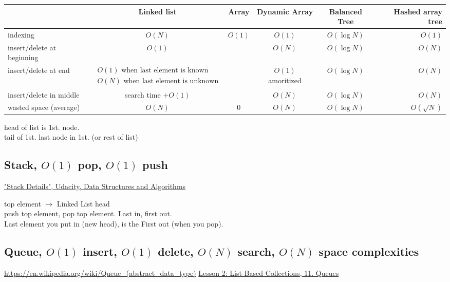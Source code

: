 \documentclass[10pt]{amsart}
\begin{document}
\begin{multicols*}{2}
\begin{center}
	\begin{tabular}{ l | c | c | c | c | r }
		\hline
		& Linked list & Array & Dynamic Array & Balanced Tree & Hashed array tree \\ \hline 
		indexing & $O(N)$ & $O(1)$ & $O(1)$ & $O(\log{N})$ & $O(1)$ \\ \hline 
		insert/delete at beginning & $O(1)$ &  & $O(N)$ & $O(\log{N})$ & $O(N)$ \\ \hline 
		insert/delete at end & $\begin{gathered} O(1) \text{ when last element is known } \\ O(N) \text{ when last element is unknown }\end{gathered}$ &  & $O(1)$ amoritized  & $O(\log{N})$  & $O(N)$ \\ \hline 
		insert/delete in middle & search time $+ O(1)$ &  & $O(N)$ & $O(\log{N})$ & $O(N)$ \\ \hline 
		wasted space (average) & $O(N)$ & 0  & $O(N)$ & $O(\log{N})$ & $O(\sqrt{N})$ \\ \hline 
		\hline
	\end{tabular}
\end{center}

head of list is 1st. node. \\
tail of 1st. last node in 1st. (or rest of list)

\subsection{Stack, $O(1)$ pop, $O(1)$ push}

\href{https://classroom.udacity.com/courses/ud513/lessons/7117335401/concepts/71225347790923}{"Stack Details", Udacity, Data Structures and Algorithms}

top element $\mapsto $ Linked List head \\
push top element, pop top element.
Last in, first out. \\
Last element you put in (new head), is the First out (when you pop).

\subsection{Queue, $O(1)$ insert, $O(1)$ delete, $O(N)$ search, $O(N)$ space complexities}

\url{https://en.wikipedia.org/wiki/Queue_(abstract_data_type)}
\href{https://classroom.udacity.com/courses/ud513/lessons/7117335401/concepts/71222050580923}{Lesson 2: List-Based Collections, 11. Queues}


\end{multicols*}
\end{document}
